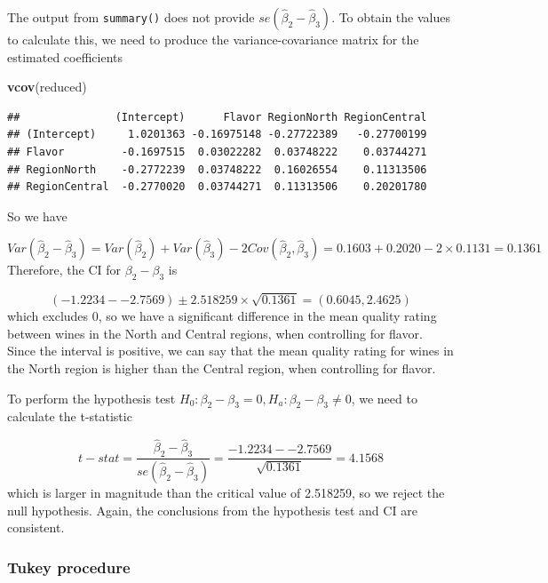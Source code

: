 \documentclass[
]{book}
\newenvironment{Shaded}{\begin{snugshade}}{\end{snugshade}}
\newcommand{\FunctionTok}[1]{\textcolor[rgb]{0.13,0.29,0.53}{\textbf{#1}}}
\newcommand{\NormalTok}[1]{#1}
\begin{document}
The output from \texttt{summary()} does not provide \(se(\hat{\beta}_2 - \hat{\beta}_3)\). To obtain the values to calculate this, we need to produce the variance-covariance matrix for the estimated coefficients

\begin{Shaded}
\begin{Highlighting}[]
\FunctionTok{vcov}\NormalTok{(reduced)}
\end{Highlighting}
\end{Shaded}

\begin{verbatim}
##               (Intercept)      Flavor RegionNorth RegionCentral
## (Intercept)     1.0201363 -0.16975148 -0.27722389   -0.27700199
## Flavor         -0.1697515  0.03022282  0.03748222    0.03744271
## RegionNorth    -0.2772239  0.03748222  0.16026554    0.11313506
## RegionCentral  -0.2770020  0.03744271  0.11313506    0.20201780
\end{verbatim}

So we have

\[
Var(\hat{\beta}_2-\hat{\beta}_3) = Var(\hat{\beta}_2) + Var(\hat{\beta}_3) - 2Cov(\hat{\beta}_2,\hat{\beta}_3) = 0.1603 + 0.2020 - 2 \times 0.1131 = 0.1361
\]
Therefore, the CI for \(\beta_2 - \beta_3\) is

\[
(-1.2234 - -2.7569 ) \pm 2.518259 \times \sqrt{0.1361} = (0.6045, 2.4625)
\]
which excludes 0, so we have a significant difference in the mean quality rating between wines in the North and Central regions, when controlling for flavor. Since the interval is positive, we can say that the mean quality rating for wines in the North region is higher than the Central region, when controlling for flavor.

To perform the hypothesis test \(H_0: \beta_2 - \beta_3 = 0, H_a: \beta_2 - \beta_3 \neq 0\), we need to calculate the t-statistic

\[
t-stat = \frac{\hat{\beta}_2 - \hat{\beta}_3}{se(\hat{\beta}_2 - \hat{\beta}_3)} = \frac{-1.2234 - -2.7569}{\sqrt{0.1361}} = 4.1568
\]
which is larger in magnitude than the critical value of 2.518259, so we reject the null hypothesis. Again, the conclusions from the hypothesis test and CI are consistent.

\hypertarget{tukey-procedure-1}{%
\subsubsection*{Tukey procedure}\label{tukey-procedure-1}}
\end{document}
